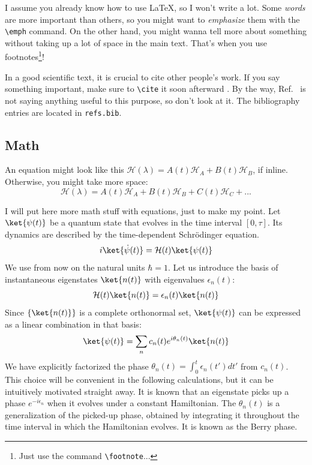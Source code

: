 

I assume you already know how to use \LaTeX, so I won't write a lot.
Some \emph{words} are more important than others, so you might want to \emph{emphasize} them with the \texttt{\textbackslash emph} command.
On the other hand, you might wanna tell more about something without taking up a lot of space in the main text.
That's when you use footnotes\footnote{Just use the command \texttt{\textbackslash footnote}...}!

In a good scientific text, it is crucial to cite other people's work. If you say something important, make sure to \texttt{\textbackslash cite} it soon afterward \cite{10.1088/1367-2630/ad313e}. By the way, Ref.~\cite{10.1088/1367-2630/ad313e} is not saying anything useful to this purpose, so don't look at it. The bibliography entries are located in \texttt{refs.bib}.




\subsection{Math}

An equation might look like this $\mathcal{H}(\lambda) = A(t)\mathcal{H}_{A} + B(t)\mathcal{H}_{B}$, if inline. 
Otherwise, you might take more space:
\begin{equation*}
    \mathcal{H}(\lambda) = A(t)\mathcal{H}_{A} + B(t)\mathcal{H}_{B} + C(t)\mathcal{H}_{C} + ...
\end{equation*}

I will put here more math stuff with equations, just to make my point. Let $\ket{\psi(t)}$ be a quantum state that evolves in the time interval $[0,\tau]$. Its dynamics are described by the time-dependent Schrödinger equation.
$$i\ket{\dot\psi(t)} = \mathcal{H}(t)\ket{\psi(t)}$$
We use from now on the natural units $\hbar=1$. Let us introduce the basis of instantaneous eigenstates $\ket{n(t)}$ with eigenvalues $\epsilon_n(t)$:
\begin{equation}
    \label{eq:adth-eigenvalue}
    \mathcal{H}(t)\ket{n(t)} = \epsilon_n(t) \ket{n(t)}
\end{equation}
Since $\{\ket{n(t)}\}$ is a complete orthonormal set, $\ket{\psi(t)}$ can be expressed as a linear combination in that basis:
\begin{equation}
    \ket{\psi(t)} = \sum_n c_n(t) e^{i\theta_n(t)} \ket{n(t)}
\end{equation}
We have explicitly factorized the phase $\theta_n(t)=\int_0^t \epsilon_n(t')dt'$ from $c_n(t)$. This choice will be convenient in the following calculations, but it can be intuitively motivated straight away. 
It is known that an eigenstate picks up a phase $e^{-i\epsilon_n}$ when it evolves under a constant Hamiltonian. The $\theta_n(t)$ is a generalization of the picked-up phase, obtained by integrating it throughout the time interval in which the Hamiltonian evolves. It is known as the Berry phase.\\


